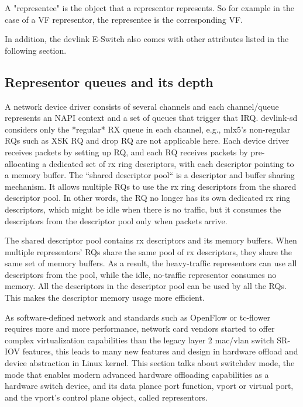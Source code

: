 \documentclass[letterpaper]{article}
\begin{document}
A "representee" is the object that a representor represents.  So for example in
the case of a VF representor, the representee is the corresponding VF.

In addition, the devlink E-Switch also comes with other attributes listed
in the following section.

\subsection{Representor queues and its depth}
A network device driver consists of several channels and each channel/queue
represents an NAPI context and a set of queues that trigger that IRQ.
devlink-sd considers only the *regular* RX queue in each channel,
e.g., mlx5's non-regular RQs such as XSK RQ and drop RQ are not applicable
here. Each device driver receives packets by setting up RQ, and
each RQ receives packets by pre-allocating a dedicated set of rx
ring descriptors, with each descriptor pointing to a memory buffer.
The ``shared descriptor pool`` is a descriptor and buffer sharing
mechanism. It allows multiple RQs to use the rx ring descriptors
from the shared descriptor pool. In other words, the RQ no longer has
its own dedicated rx ring descriptors, which might be idle when there
is no traffic, but it consumes the descriptors from the descriptor
pool only when packets arrive.

The shared descriptor pool contains rx descriptors and its memory
buffers. When multiple representors' RQs share the same pool of rx
descriptors, they share the same set of memory buffers. As a result,
the heavy-traffic representors can use all descriptors from the pool,
while the idle, no-traffic representor consumes no memory. All the
descriptors in the descriptor pool can be used by all the RQs. This
makes the descriptor memory usage more efficient.


As software-defined network and standards such as OpenFlow or tc-flower
requires more and more performance, network card vendors started to offer
complex virtualization capabilities than the legacy layer 2 mac/vlan switch
SR-IOV features, this leads to many new features and design in hardware offload
and device abstraction in Linux kernel.
This section talks about switchdev mode, the mode that enables
modern advanced hardware offloading capabilities as a hardware switch device,
and its data plance port function, vport or virtual port, and the vport's
control plane object, called representors.
\end{document}
